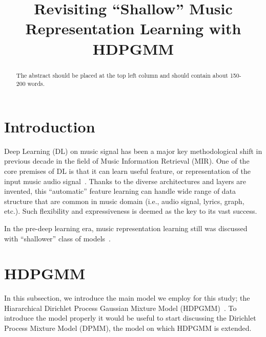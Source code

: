 \documentclass{article}
\title{Revisiting ``Shallow'' Music Representation Learning with HDPGMM}
\begin{document}
%
\maketitle
%
\begin{abstract}
The abstract should be placed at the top left column and should contain about 150-200 words.
\end{abstract}
%
\section{Introduction}\label{sec:introduction}

Deep Learning (DL) on music signal has been a major key methodological shift in previous decade in the field of Music Information Retrieval (MIR). One of the core premises of DL is that it can learn useful feature, or representation of the input music audio signal~\cite{DBLP:conf/ismir/HumphreyBL12,DBLP:conf/ismir/HamelDYG13}. Thanks to the diverse architectures and layers are invented, this ``automatic'' feature learning can handle wide range of data structure that are common in music domain (i.e., audio signal, lyrics, graph, etc.). Such flexibility and expressiveness is deemed as the key to its vast success.


In the pre-deep learning era, music representation learning still was discussed with ``shallower'' class of models~\cite{DBLP:conf/ismir/WangLWJ11, DBLP:conf/ismir/HamelDYG13, DBLP:conf/ismir/NamHSS12}.


%

% 

\section{HDPGMM}\label{sec:hdpgmm}

In this subsection, we introduce the main model we employ for this study; the Hiararchical Dirichlet Process Gaussian Mixture Model (HDPGMM)~\cite{DBLP:conf/ismir/HoffmanBC08, doi:10.1198/016214506000000302}. To introduce the model properly it would be useful to start discussing the Dirichlet Process Mixture Model (DPMM), the model on which HDPGMM is extended.
\end{document}
